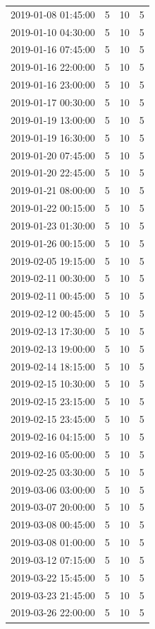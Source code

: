 \begin{tabular}{lrrr}
2019-01-08 01:45:00 & 5 & 10 & 5 \\
2019-01-10 04:30:00 & 5 & 10 & 5 \\
2019-01-16 07:45:00 & 5 & 10 & 5 \\
2019-01-16 22:00:00 & 5 & 10 & 5 \\
2019-01-16 23:00:00 & 5 & 10 & 5 \\
2019-01-17 00:30:00 & 5 & 10 & 5 \\
2019-01-19 13:00:00 & 5 & 10 & 5 \\
2019-01-19 16:30:00 & 5 & 10 & 5 \\
2019-01-20 07:45:00 & 5 & 10 & 5 \\
2019-01-20 22:45:00 & 5 & 10 & 5 \\
2019-01-21 08:00:00 & 5 & 10 & 5 \\
2019-01-22 00:15:00 & 5 & 10 & 5 \\
2019-01-23 01:30:00 & 5 & 10 & 5 \\
2019-01-26 00:15:00 & 5 & 10 & 5 \\
2019-02-05 19:15:00 & 5 & 10 & 5 \\
2019-02-11 00:30:00 & 5 & 10 & 5 \\
2019-02-11 00:45:00 & 5 & 10 & 5 \\
2019-02-12 00:45:00 & 5 & 10 & 5 \\
2019-02-13 17:30:00 & 5 & 10 & 5 \\
2019-02-13 19:00:00 & 5 & 10 & 5 \\
2019-02-14 18:15:00 & 5 & 10 & 5 \\
2019-02-15 10:30:00 & 5 & 10 & 5 \\
2019-02-15 23:15:00 & 5 & 10 & 5 \\
2019-02-15 23:45:00 & 5 & 10 & 5 \\
2019-02-16 04:15:00 & 5 & 10 & 5 \\
2019-02-16 05:00:00 & 5 & 10 & 5 \\
2019-02-25 03:30:00 & 5 & 10 & 5 \\
2019-03-06 03:00:00 & 5 & 10 & 5 \\
2019-03-07 20:00:00 & 5 & 10 & 5 \\
2019-03-08 00:45:00 & 5 & 10 & 5 \\
2019-03-08 01:00:00 & 5 & 10 & 5 \\
2019-03-12 07:15:00 & 5 & 10 & 5 \\
2019-03-22 15:45:00 & 5 & 10 & 5 \\
2019-03-23 21:45:00 & 5 & 10 & 5 \\
2019-03-26 22:00:00 & 5 & 10 & 5 \\

\end{tabular}
